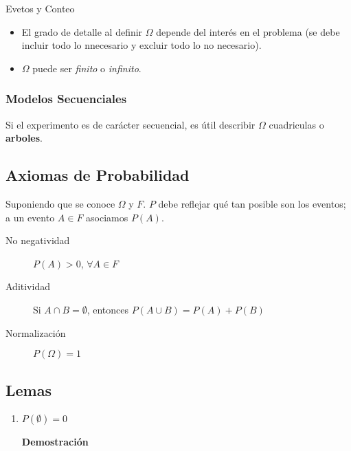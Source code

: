 \documentclass[a4paper]{book}
\begin{document}
\begin{chapter}{Evetos y Conteo}
    \begin{obs}
        \begin{itemize}
            \item El grado de detalle al definir $\Omega$ depende del interés en el
            problema (se debe incluir todo lo nnecesario y excluir todo lo no
            necesario).
             \item $\Omega$ puede ser \textit{finito} o \textit{infinito}.
        \end{itemize}
    \end{obs}

    \subsubsection{Modelos Secuenciales}
    \label{ssec:modelos_secuenciales}

    Si el experimento es de carácter secuencial, es útil describir $\Omega$
    cuadriculas o \textbf{arboles}.


    \subsection{Axiomas de Probabilidad}
    \label{ssec:axiomas_de_probabilidad}

    Suponiendo que se conoce $\Omega$ y $F$. $P$ debe reflejar qué tan posible
    son los eventos; a un evento $A\in F$ asociamos $P\left(A\right)$.

    \begin{description}
        \item[No negatividad]  $P\left(A\right)>0$, $\forall A\in F$

        \item[Aditividad] Si $A\cap B =\emptyset$, entonces $P\left(A\cup B\right)=P\left(A\right)+P\left(B\right)$

        \item[Normalización] $P\left(\Omega\right)=1$
    \end{description}

    \subsection{Lemas}
    \label{ssec:lemas}

    \begin{enumerate}[{1. }]
        \item $P\left(\emptyset\right)=0$

        \textbf{Demostración}


\end{enumerate}
\end{chapter}
\end{document}
